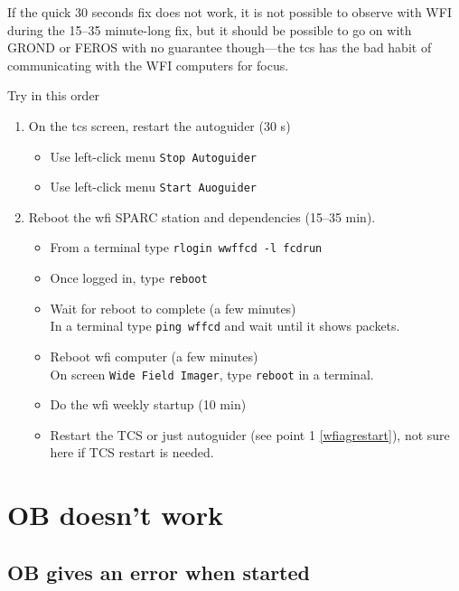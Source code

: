 \documentclass[11pt,fleqn]{book} %
\begin{document}
If the quick 30 seconds fix does not work, it is not possible to observe with WFI during the 15--35 minute-long fix, but it should be possible to go on with GROND or FEROS with no guarantee though---the \gls{tcs} has the bad habit of communicating with the WFI computers for focus. 

Try in this order
\begin{enumerate}
  \item\label{wfiagrestart}
       On the \gls{tcs} screen, restart the autoguider (30 s)
    \begin{itemize}
       \item Use left-click menu \texttt{Stop Autoguider}
       \item Use left-click menu \texttt{Start Auoguider}
    \end{itemize}
  \item Reboot the \gls{wfi} SPARC station and dependencies (15--35 min).
    \begin{itemize}
        \item From a terminal type \texttt{rlogin wwffcd -l fcdrun}
        \item Once logged in, type \texttt{reboot}
        \item Wait for reboot to complete (a few minutes)\\
              In a terminal type \texttt{ping wffcd} and wait until it shows packets.
        \item Reboot \gls{wfi} computer (a few minutes)\\
              On screen \texttt{Wide Field Imager}, type \texttt{reboot} in a terminal.
        \item Do the \gls{wfi} weekly startup (10 min)
        \item Restart the TCS or just autoguider (see point 1 \ref{wfiagrestart}), not sure here if TCS restart is needed.
    \end{itemize}
\end{enumerate}

\section{OB doesn't work}

\subsection{OB gives an error when started}
\end{document}
